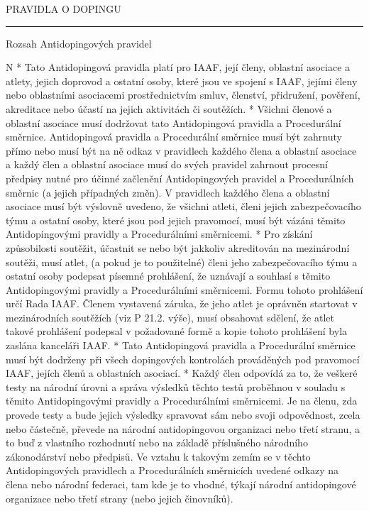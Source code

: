 \sec PRAVIDLA O DOPINGU

\rule{29}
\secc Rozsah Antidopingových pravidel

\begitems \style N
* Tato Antidopingová pravidla platí pro IAAF, její členy, oblastní asociace a atlety, jejich doprovod a ostatní osoby, které jsou ve spojení s IAAF, jejími členy nebo oblastními asociacemi prostřednictvím smluv, členství, přidružení, pověření, akreditace nebo účastí na jejich aktivitách či soutěžích.
* Všichni členové a oblastní asociace musí dodržovat tato Antidopingová pravidla a Procedurální směrnice. Antidopingová pravidla a Procedurální směrnice musí být zahrnuty přímo nebo musí být na ně odkaz v pravidlech každého člena a oblastní asociace a každý člen a oblastní asociace musí do svých pravidel zahrnout procesní předpisy nutné pro účinné začlenění Antidopingových pravidel a Procedurálních směrnic (a jejich případných změn). V pravidlech každého člena a oblastní asociace musí být výslovně uvedeno, že všichni atleti, členi jejich zabezpečovacího týmu a ostatní osoby, které jsou pod jejich pravomocí, musí být vázáni těmito Antidopingovými pravidly a Procedurálními směrnicemi.
* Pro získání způsobilosti soutěžit, účastnit se nebo být jakkoliv akreditován na mezinárodní soutěži, musí atlet, (a pokud je to použitelné) členi jeho zabezpečovacího týmu a ostatní osoby podepsat písemné prohlášení, že uznávají a souhlasí s těmito Antidopingovými pravidly a Procedurálními směrnicemi. Formu tohoto prohlášení určí Rada IAAF. Členem vystavená záruka, že jeho atlet je oprávněn startovat v mezinárodních soutěžích (viz P 21.2. výše), musí obsahovat sdělení, že atlet takové prohlášení podepsal v požadované formě a kopie tohoto prohlášení byla zaslána kanceláři IAAF.
* Tato Antidopingová pravidla a Procedurální směrnice musí být dodrženy při všech dopingových kontrolách prováděných pod pravomocí IAAF, jejích členů a oblastních asociací.
* Každý člen odpovídá za to, že veškeré testy na národní úrovni a správa výsledků těchto testů proběhnou v souladu s těmito Antidopingovými pravidly a Procedurálními směrnicemi. Je na členu, zda provede testy a bude jejich výsledky spravovat sám nebo svoji odpovědnost, zcela nebo částečně, převede na národní antidopingovou organizaci nebo třetí stranu, a to buď z vlastního rozhodnutí nebo na základě příslušného národního zákonodárství nebo předpisů. Ve vztahu k takovým zemím se v těchto Antidopingových pravidlech a Procedurálních směrnicích uvedené odkazy na člena nebo národní federaci, tam kde je to vhodné, týkají národní antidopingové organizace nebo třetí strany (nebo jejich činovníků).
